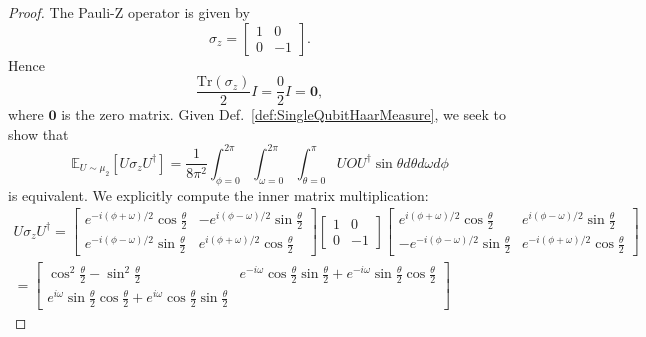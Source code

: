 \begin{proof}
The Pauli-Z operator is given by
\begin{equation}
    \sigma_{z} = \begin{bmatrix} 1 & 0 \\ 0 & -1 \end{bmatrix}.
\end{equation}
Hence
\begin{equation}
    \frac{\text{Tr}(\sigma_{z})}{2}I = \frac{0}{2} I = \mathbf{0},
\end{equation}
where $\mathbf{0}$ is the zero matrix.
Given Def.~\ref{def:SingleQubitHaarMeasure}, we seek to show that
\begin{equation}
    \mathbb{E}_{U \sim \mu_{2}} [U\sigma_{z}U^{\dagger}] = \frac{1}{8\pi^2}\int_{\phi = 0}^{2\pi} \int_{\omega = 0}^{2\pi} \int_{\theta = 0}^{\pi} UOU^{\dagger} \sin \theta d\theta d\omega d\phi
\end{equation}
is equivalent.
We explicitly compute the inner matrix multiplication:
\begin{equation}
\begin{split}
    U\sigma_{z} U^{\dagger} = \begin{bmatrix}
            e^{-i (\phi + \omega) / 2} \cos{\frac{\theta}{2}} & -e^{i (\phi - \omega) / 2} \sin{\frac{\theta}{2}}\\
            e^{-i (\phi - \omega) / 2} \sin{\frac{\theta}{2}} & e^{i (\phi + \omega) / 2} \cos{\frac{\theta}{2}}
        \end{bmatrix} \begin{bmatrix} 1 & 0 \\ 0 & -1 \end{bmatrix}
        \begin{bmatrix}
        e^{i( \phi + \omega) / 2} \cos{\frac{\theta}{2}} & e^{i (\phi - \omega) / 2} \sin{\frac{\theta}{2}}\\
        - e^{-i (\phi - \omega) / 2} \sin{\frac{\theta}{2}} & e^{-i(\phi + \omega)/ 2} \cos{\frac{\theta}{2}} \end{bmatrix}\\
        = \begin{bmatrix}
            \cos^{2}{\frac{\theta}{2}} - \sin^{2}{\frac{\theta}{2}}
            & e^{-i \omega} \cos{\frac{\theta}{2}} \sin{\frac{\theta}{2}} + e^{-i\omega} \sin{\frac{\theta}{2}} \cos{\frac{\theta}{2}}\\
            e^{i \omega} \sin{\frac{\theta}{2}} \cos{\frac{\theta}{2}} + e^{i \omega} \cos{\frac{\theta}{2}} \sin{\frac{\theta}{2}}

\end{bmatrix}
\end{split}
\end{equation}
\end{proof}

